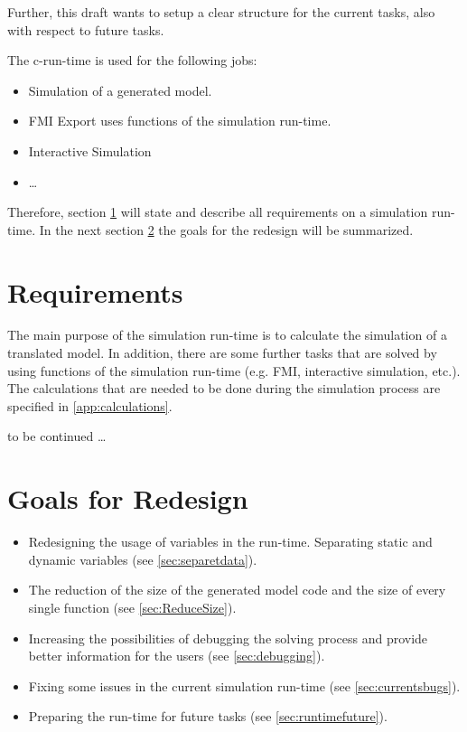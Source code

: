 Further, this draft wants to setup a clear structure for the current tasks,
also with respect to future tasks.

The c-run-time is used for the following jobs:
\begin{itemize}
  \item Simulation of a generated model.
  \item FMI Export uses functions of the simulation run-time\cite{openmodelica.org:doc-extra:fmi1.0}.
  \item Interactive Simulation
  \item \ldots
\end{itemize}

Therefore, section \ref{sec:requirements} will state and describe all
requirements on a simulation run-time. In the next section \ref{sec:goals} the
goals for the redesign will be summarized.


\section{Requirements}\label{sec:requirements}

The main purpose of the simulation run-time is to calculate the simulation of a
translated model. In addition, there are some further tasks that are solved by
using functions of the simulation run-time (e.g. FMI, interactive simulation,
 etc.). The calculations that are needed to be done during the simulation
 process are specified in \ref{app:calculations}.

to be continued \ldots

\section{Goals for Redesign}\label{sec:goals}

\begin{itemize}
  \item Redesigning the usage of variables in the run-time. Separating static
  and dynamic variables (see \ref{sec:separetdata}).
  \item The reduction of the size of the generated model code and the size
  of every single function (see \ref{sec:ReduceSize}).
  \item Increasing the possibilities of debugging the solving process and
  provide better information for the users (see \ref{sec:debugging}).
  \item Fixing some issues in the current simulation run-time (see
  \ref{sec:currentsbugs}).
  \item Preparing the run-time for future tasks (see
  \ref{sec:runtimefuture}).
\end{itemize}


